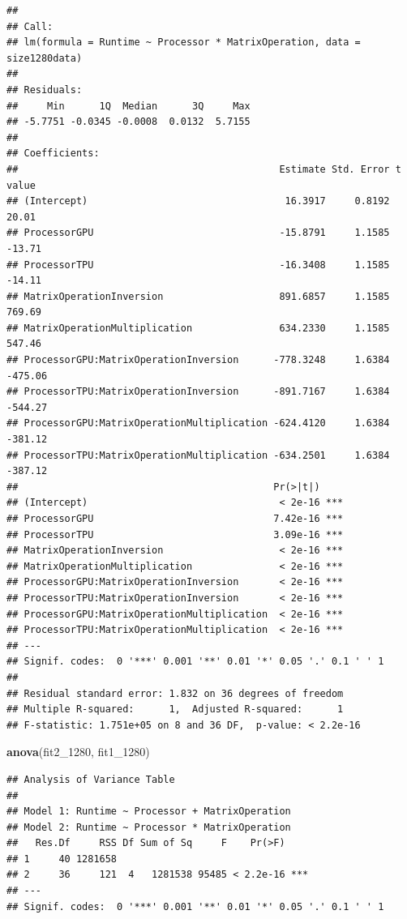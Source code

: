\documentclass[
]{article}
\newenvironment{Shaded}{\begin{snugshade}}{\end{snugshade}}
\newcommand{\DecValTok}[1]{\textcolor[rgb]{0.00,0.00,0.81}{#1}}
\newcommand{\KeywordTok}[1]{\textcolor[rgb]{0.13,0.29,0.53}{\textbf{#1}}}
\newcommand{\NormalTok}[1]{#1}
\begin{document}
\begin{verbatim}
## 
## Call:
## lm(formula = Runtime ~ Processor * MatrixOperation, data = size1280data)
## 
## Residuals:
##     Min      1Q  Median      3Q     Max 
## -5.7751 -0.0345 -0.0008  0.0132  5.7155 
## 
## Coefficients:
##                                             Estimate Std. Error t value
## (Intercept)                                  16.3917     0.8192   20.01
## ProcessorGPU                                -15.8791     1.1585  -13.71
## ProcessorTPU                                -16.3408     1.1585  -14.11
## MatrixOperationInversion                    891.6857     1.1585  769.69
## MatrixOperationMultiplication               634.2330     1.1585  547.46
## ProcessorGPU:MatrixOperationInversion      -778.3248     1.6384 -475.06
## ProcessorTPU:MatrixOperationInversion      -891.7167     1.6384 -544.27
## ProcessorGPU:MatrixOperationMultiplication -624.4120     1.6384 -381.12
## ProcessorTPU:MatrixOperationMultiplication -634.2501     1.6384 -387.12
##                                            Pr(>|t|)    
## (Intercept)                                 < 2e-16 ***
## ProcessorGPU                               7.42e-16 ***
## ProcessorTPU                               3.09e-16 ***
## MatrixOperationInversion                    < 2e-16 ***
## MatrixOperationMultiplication               < 2e-16 ***
## ProcessorGPU:MatrixOperationInversion       < 2e-16 ***
## ProcessorTPU:MatrixOperationInversion       < 2e-16 ***
## ProcessorGPU:MatrixOperationMultiplication  < 2e-16 ***
## ProcessorTPU:MatrixOperationMultiplication  < 2e-16 ***
## ---
## Signif. codes:  0 '***' 0.001 '**' 0.01 '*' 0.05 '.' 0.1 ' ' 1
## 
## Residual standard error: 1.832 on 36 degrees of freedom
## Multiple R-squared:      1,  Adjusted R-squared:      1 
## F-statistic: 1.751e+05 on 8 and 36 DF,  p-value: < 2.2e-16
\end{verbatim}

\begin{Shaded}
\begin{Highlighting}[]
\KeywordTok{anova}\NormalTok{(fit2\_}\DecValTok{1280}\NormalTok{, fit1\_}\DecValTok{1280}\NormalTok{)}
\end{Highlighting}
\end{Shaded}

\begin{verbatim}
## Analysis of Variance Table
## 
## Model 1: Runtime ~ Processor + MatrixOperation
## Model 2: Runtime ~ Processor * MatrixOperation
##   Res.Df     RSS Df Sum of Sq     F    Pr(>F)    
## 1     40 1281658                                 
## 2     36     121  4   1281538 95485 < 2.2e-16 ***
## ---
## Signif. codes:  0 '***' 0.001 '**' 0.01 '*' 0.05 '.' 0.1 ' ' 1
\end{verbatim}
\end{document}
